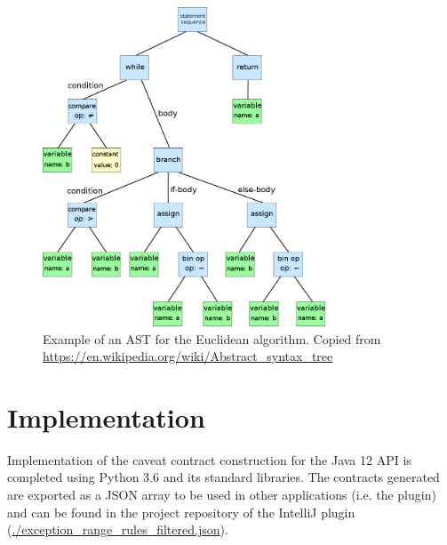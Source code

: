 \clearpage
\begin{figure}
	\label{fig:ast}
	\centering
	\includegraphics[width=0.75\textwidth]{figs/ast.png}
	\caption{Example of an AST for the Euclidean algorithm. Copied from \url{https://en.wikipedia.org/wiki/Abstract\_syntax\_tree}}
\end{figure}


\section{Implementation}
\label{sec:contract-implement}
Implementation of the caveat contract construction for the Java 12 API is completed using Python 3.6 and its standard libraries. The contracts generated are exported as a JSON array to be used in other applications (i.e. the plugin) and can be found in the project repository of the IntelliJ plugin (\url{./exception_range_rules_filtered.json}).

